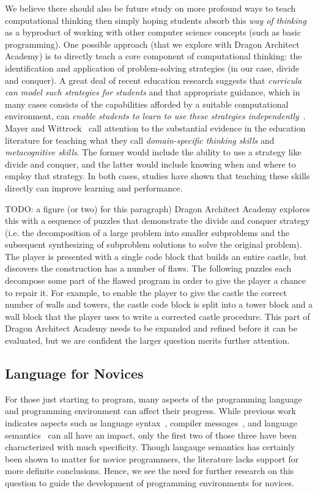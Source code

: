 \documentclass{sig-alternate}
\newcommand{\TODO}[1]{{\color{red} TODO: #1}}
\newcommand{\gametitle}{{\color{RoyalPurple} Dragon Architect Academy}}
\begin{document}
We believe there should also be future study on more profound ways to teach computational thinking then simply hoping students absorb this \emph{way of thinking} as a byproduct of working with other computer science concepts (such as basic programming). 
One possible approach (that we explore with \gametitle{}) is to directly teach a core component of computational thinking: the identification and application of problem-solving strategies (in our case, divide and conquer). 
A great deal of recent education research suggests that \emph{curricula can model such strategies for students} and that appropriate guidance, which in many cases consists of the capabilities afforded by a suitable computational environment, can \emph{enable students to learn to use these strategies independently}~\cite{report2010computational}. 
Mayer and Wittrock~\cite{mayer1996handbook} call attention to the substantial evidence in the education literature for teaching what they call \emph{domain-specific thinking skills} and \emph{metacognitive skills}. 
The former would include the ability to use a strategy like divide and conquer, and the latter would include knowing when and where to employ that strategy. 
In both cases, studies have shown that teaching these skills directly can improve learning and performance. 

\TODO{a figure (or two) for this paragraph)}
\gametitle{} explores this with a sequence of puzzles that demonstrate the divide and conquer strategy (i.e. the decomposition of a large problem into smaller subproblems and the subsequent synthesizing of subproblem solutions to solve the original problem). 
The player is presented with a single code block that builds an entire castle, but discovers the construction has a number of flaws. 
The following puzzles each decompose some part of the flawed program in order to give the player a chance to repair it. 
For example, to enable the player to give the castle the correct number of walls and towers, the castle code block is split into a tower block and a wall block that the player uses to write a corrected castle procedure. 
This part of \gametitle{} needs to be expanded and refined before it can be evaluated, but we are confident the larger question merits further attention. 

\subsection{Language for Novices}
For those just starting to program, many aspects of the programming language and programming environment can affect their progress. 
While previous work indicates aspects such as language syntax~\cite{stefik2013syntax}, compiler messages~\cite{nienaltowski2008compiler}, and language semantics~\cite{hoc1990language} can all have an impact, only the first two of those three have been characterized with much specificity. 
Though langauge semantics has certainly been shown to matter for novice programmers, the literature lacks support for more definite conclusions. 
Hence, we see the need for further research on this question to guide the development of programming environments for novices.
\end{document}
